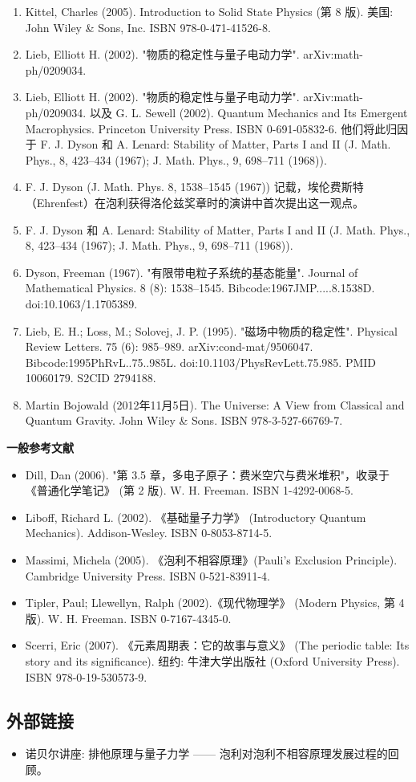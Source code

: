 \begin{enumerate}
\item Kittel, Charles (2005). Introduction to Solid State Physics (第 8 版). 美国: John Wiley & Sons, Inc. ISBN 978-0-471-41526-8.  
\item Lieb, Elliott H. (2002). "物质的稳定性与量子电动力学". arXiv:math-ph/0209034.  
\item Lieb, Elliott H. (2002). "物质的稳定性与量子电动力学". arXiv:math-ph/0209034. 以及 G. L. Sewell (2002). Quantum Mechanics and Its Emergent Macrophysics. Princeton University Press. ISBN 0-691-05832-6. 他们将此归因于 F. J. Dyson 和 A. Lenard: Stability of Matter, Parts I and II (J. Math. Phys., 8, 423–434 (1967); J. Math. Phys., 9, 698–711 (1968)).  
\item F. J. Dyson (J. Math. Phys. 8, 1538–1545 (1967)) 记载，埃伦费斯特（Ehrenfest）在泡利获得洛伦兹奖章时的演讲中首次提出这一观点。  
\item F. J. Dyson 和 A. Lenard: Stability of Matter, Parts I and II (J. Math. Phys., 8, 423–434 (1967); J. Math. Phys., 9, 698–711 (1968)).  
\item Dyson, Freeman (1967). "有限带电粒子系统的基态能量". Journal of Mathematical Physics. 8 (8): 1538–1545. Bibcode:1967JMP.....8.1538D. doi:10.1063/1.1705389.  
\item Lieb, E. H.; Loss, M.; Solovej, J. P. (1995). "磁场中物质的稳定性". Physical Review Letters. 75 (6): 985–989. arXiv:cond-mat/9506047. Bibcode:1995PhRvL..75..985L. doi:10.1103/PhysRevLett.75.985. PMID 10060179. S2CID 2794188.  
\item Martin Bojowald (2012年11月5日). The Universe: A View from Classical and Quantum Gravity. John Wiley & Sons. ISBN 978-3-527-66769-7.
\end{enumerate}
\textbf{一般参考文献}
\begin{itemize}
\item Dill, Dan (2006). "第 3.5 章，多电子原子：费米空穴与费米堆积"，收录于《普通化学笔记》 (第 2 版). W. H. Freeman. ISBN 1-4292-0068-5.  
\item Liboff, Richard L. (2002). 《基础量子力学》 (Introductory Quantum Mechanics). Addison-Wesley. ISBN 0-8053-8714-5.  
\item Massimi, Michela (2005). 《泡利不相容原理》(Pauli's Exclusion Principle). Cambridge University Press. ISBN 0-521-83911-4.  
\item Tipler, Paul; Llewellyn, Ralph (2002).《现代物理学》 (Modern Physics, 第 4 版). W. H. Freeman. ISBN 0-7167-4345-0.  
\item Scerri, Eric (2007). 《元素周期表：它的故事与意义》 (The periodic table: Its story and its significance). 纽约: 牛津大学出版社 (Oxford University Press). ISBN 978-0-19-530573-9.
\end{itemize}
\subsection{外部链接}
\begin{itemize}
\item 诺贝尔讲座: 排他原理与量子力学 —— 泡利对泡利不相容原理发展过程的回顾。
\end{itemize}